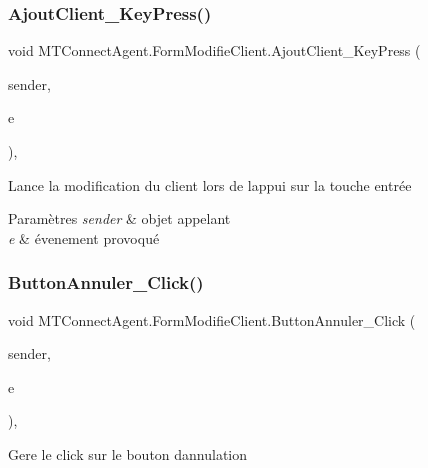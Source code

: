 \subsubsection{\texorpdfstring{Ajout\+Client\+\_\+\+Key\+Press()}{AjoutClient\_KeyPress()}}
{\footnotesize\ttfamily void M\+T\+Connect\+Agent.\+Form\+Modifie\+Client.\+Ajout\+Client\+\_\+\+Key\+Press (\begin{DoxyParamCaption}\item[{object}]{sender,  }\item[{Key\+Press\+Event\+Args}]{e }\end{DoxyParamCaption})\hspace{0.3cm}{\ttfamily [inline]}, {\ttfamily [private]}}



Lance la modification du client lors de l\textquotesingle{}appui sur la touche entrée 


\begin{DoxyParams}{Paramètres}
{\em sender} & objet appelant\\
\hline
{\em e} & évenement provoqué\\
\hline
\end{DoxyParams}
\mbox{\label{class_m_t_connect_agent_1_1_form_modifie_client_adfee7a9d6c7b0998a3e69cc2d78270b9}} 
\subsubsection{\texorpdfstring{Button\+Annuler\+\_\+\+Click()}{ButtonAnnuler\_Click()}}
{\footnotesize\ttfamily void M\+T\+Connect\+Agent.\+Form\+Modifie\+Client.\+Button\+Annuler\+\_\+\+Click (\begin{DoxyParamCaption}\item[{object}]{sender,  }\item[{Event\+Args}]{e }\end{DoxyParamCaption})\hspace{0.3cm}{\ttfamily [inline]}, {\ttfamily [private]}}



Gere le click sur le bouton d\textquotesingle{}annulation 


